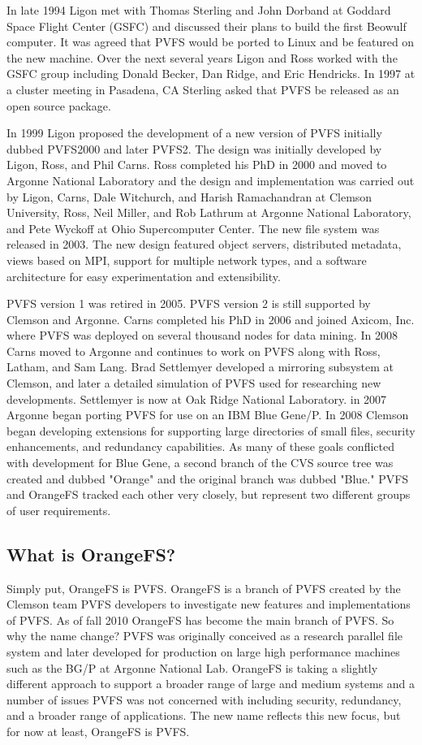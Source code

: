 \documentclass[11pt,letterpaper]{article}
\begin{document}
In late 1994 Ligon met with Thomas Sterling and John Dorband at Goddard
Space Flight Center (GSFC) and discussed their plans to build the first
Beowulf computer. It was agreed that PVFS would be ported to Linux
and be featured on the new machine. Over the next several years Ligon
and Ross worked with the GSFC group including Donald Becker, Dan Ridge,
and Eric Hendricks. In 1997 at a cluster meeting in Pasadena, CA
Sterling asked that PVFS be released as an open source package.

In 1999 Ligon proposed the development of a new version of PVFS
initially dubbed PVFS2000 and later PVFS2. The design was initially
developed by Ligon, Ross, and Phil Carns. Ross completed his PhD in 2000
and moved to Argonne National Laboratory and the design and
implementation was carried out by Ligon, Carns, Dale Witchurch, and
Harish Ramachandran at Clemson University, Ross, Neil Miller, and Rob
Lathrum at Argonne National Laboratory, and Pete Wyckoff at Ohio
Supercomputer Center. The new file system was released in 2003. The
new design featured object servers, distributed metadata, views based on
MPI, support for multiple network types, and a software architecture for
easy experimentation and extensibility.

PVFS version 1 was retired in 2005. PVFS version 2 is still supported by
Clemson and Argonne. Carns completed his PhD in 2006 and joined Axicom,
Inc. where PVFS was deployed on several thousand nodes for data mining.
In 2008 Carns moved to Argonne and continues to work on PVFS along with
Ross, Latham, and Sam Lang. Brad Settlemyer developed a mirroring
subsystem at Clemson, and later a detailed simulation of PVFS used for
researching new developments. Settlemyer is now at Oak Ridge National
Laboratory. in 2007 Argonne began porting PVFS for use on an IBM Blue
Gene/P. In 2008 Clemson began developing extensions for supporting
large directories of small files, security enhancements, and redundancy
capabilities. As many of these goals conflicted with development for
Blue Gene, a second branch of the CVS source tree was created and dubbed
"Orange" and the original branch was dubbed "Blue." PVFS and OrangeFS
tracked each other very closely, but represent two different groups of
user requirements.

\subsection{What is OrangeFS?}

Simply put, OrangeFS is PVFS.  OrangeFS is a branch of PVFS created by
the Clemson team PVFS developers to investigate new features and
implementations of PVFS.  As of fall 2010 OrangeFS has become the main
branch of PVFS.  So why the name change?  PVFS was originally conceived
as a research parallel file system and later developed for production on
large high performance machines such as the BG/P at Argonne National
Lab.  OrangeFS is taking a slightly different approach to support a
broader range of large and medium systems and a number of issues PVFS
was not concerned with including security, redundancy, and a broader
range of applications.  The new name reflects this new focus, but for
now at least, OrangeFS is PVFS.
\end{document}
